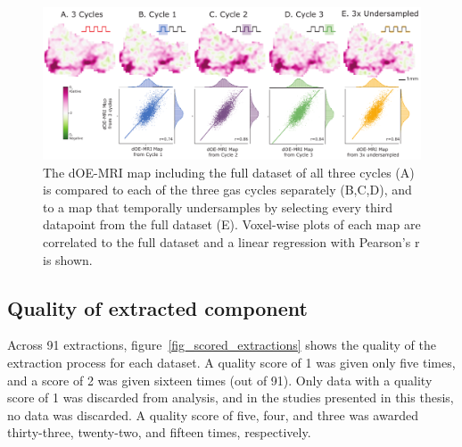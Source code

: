 \begin{figure}[htbp]
   \centering
   \includegraphics[width=\textwidth]{oemri_thesis1/oemri_thesis1-images/fig4_repeatability.pdf} %
   \caption{The \acs{dOE-MRI} map including the full dataset of all three cycles (A) is compared to each of the three gas cycles separately (B,C,D), and to a map that temporally undersamples by selecting every third datapoint from the full dataset (E).
Voxel-wise plots of each map are correlated to the full dataset and a linear regression with Pearson's r is shown.
   \label{fig_repeatability}}
\end{figure}

\subsection{Quality of extracted component}
\label{res4}

Across 91 extractions, figure~\ref{fig_scored_extractions} shows the quality of the extraction process for each dataset.
A quality score of 1 was given only five times, and a score of 2 was given sixteen times (out of 91).
Only data with a quality score of 1 was discarded from analysis, and in the studies presented in this thesis, no data was discarded.
A quality score of five, four, and three was awarded thirty-three, twenty-two, and fifteen times, respectively. 

